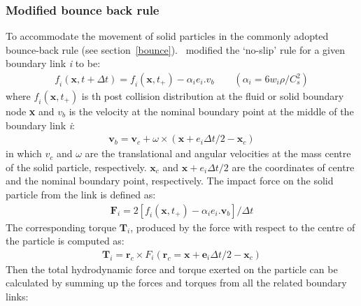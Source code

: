 
\subsubsection*{Modified bounce back rule}
To accommodate the movement of solid particles in the commonly adopted bounce-back rule (see section~\ref{bounce}).~\citet{Ladd1994} modified the `no-slip' rule for a given boundary link \textit{i} to be:
\begin{align}
\textit{f}_{\textit{i}}(\mathbf{x}, t + \Delta t)=\textit{f}_{\textit{i}}(\mathbf{x}, t_{+}) - \alpha_{\textit{i}}\mathbf{\textit{e}}_{\textit{i}}.\mathbf{\textit{v}}_{b} \qquad (\alpha_{i}=6\textit{w}_{\textit{i}}\rho/\textit{C}_{\textit{s}}^{2})
\end{align}
where $\textit{f}_{\textit{i}}(\mathbf{x}, t_{+})$ is th post collision distribution at the fluid or solid boundary node \textbf{x} and $\textit{v}_{b}$ is the velocity at the nominal boundary point at the middle of the boundary link \textit{i}:
\begin{align}
\mathbf{v}_{b}=\mathbf{v}_{c}+\omega \times (\mathbf{x}+\mathbf{\textit{e}}_{\textit{i}}\Delta t /2 - \mathbf{x}_{c})
\end{align}
in which $\mathbf{\textit{v}}_{c}$ and $\omega$ are the translational and angular velocities at the mass centre of the solid particle, respectively. $\mathbf{x}_{c}$ and $\mathbf{x}+\mathbf{\textit{e}}_{\textit{i}}\Delta t /2$ are the coordinates of centre and the nominal boundary point,  respectively. The impact force on the solid particle from the link is defined as:
\begin{align}
\mathbf{F}_{\textit{i}}=2[\textit{f}_{\textit{i}} (\mathbf{x}, t_{+}) -\alpha_{\textit{i}}\mathbf{\textit{e}}_{\textit{i}}.\mathbf{v}_{b}]/ \Delta t
\end{align} 
The corresponding torque $\mathbf{T}_{\textit{i}}$, produced by the force with respect to the centre of the particle is computed as:
\begin{align}
\mathbf{T}_{\textit{i}}=\mathbf{r}_{c} \times \textit{F}_{\textit{i}} (\mathbf{r}_{c}=\mathbf{x}+\mathbf{e}_{\textit{i}} \Delta t /2 - \mathbf{x}_{c})
\end{align}
Then the total hydrodynamic force and torque exerted on the particle can be calculated by summing up the forces and torques from all the related boundary links:
